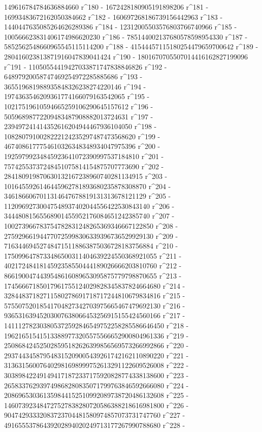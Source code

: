        149616784784636884660 r^180 - 1672428180905191898206 r^181 - 
       16993483672162050384662 r^182 - 
       160697268186739156442963 r^183 - 
       1440447635085264626289386 r^184 - 
       12312005503576803766740966 r^185 - 
       100566623831406174986620230 r^186 - 
       785144002137680578598954330 r^187 - 
       5852562548660965545115114200 r^188 - 
       41544457115180254479659700642 r^189 - 
       280416023813871916047839041424 r^190 - 
       1801670705507014416162827199096 r^191 - 
       11050554419427033871747838846826 r^192 - 
       64897920058747469254972285885686 r^193 - 
       365519681988935848326238274220146 r^194 - 
       1974363546209361774166079163542065 r^195 - 
       10217519610594665259106290645157612 r^196 - 
       50596898772209483487908882013724631 r^197 - 
       239497241414352616204944467936104050 r^198 - 
       1082807910028222124235297487473568620 r^199 - 
       4674086177754610326348348934047975396 r^200 - 
       19259799234845923641072390997537184810 r^201 - 
       75742553737248451075814154875707773690 r^202 - 
       284180919870630132167238960740281134915 r^203 - 
       1016455926146445962781893680235878308870 r^204 - 
       3461866067011314647678819131313678121129 r^205 - 
       11209692730047548937402044556422530843140 r^206 - 
       34448081565568901455952176084651242385740 r^207 - 
       100273966783754782831248265369346667122850 r^208 - 
       275929661944770725998306339396736529929130 r^209 - 
       716344694527484715118863875036728183756884 r^210 - 
       1750996478733486500311404639224550368921055 r^211 - 
       4021724841814592358550444189026666203810760 r^212 - 
       8661900474439548616089653095875779798870655 r^213 - 
       17456667185017961755124029828345837824664680 r^214 - 
       32844837182711580278691718717244810679834816 r^215 - 
       57550752018541704827342703975665467479692130 r^216 - 
       93653163945203007638066453256915155424560166 r^217 - 
       141112782303805372592846549752258285586646450 r^218 - 
       196216515415133889773205575566652900804961336 r^219 - 
       250868424525028595182626399856569573266992866 r^220 - 
       293744345879548315209005439261742162110890220 r^221 - 
       313631560076402981698999752613291122609526008 r^222 - 
       303898422491494171872337175920828774338138600 r^223 - 
       265833762939749868280835071799763846592666080 r^224 - 
       208696530361359844152510992089738720486132608 r^225 - 
       146073923484727527838280720586388218616981800 r^226 - 
       90474293332083723704481580974857073731747760 r^227 - 
       49165553786439202894020249713177267990788680 r^228 - 
